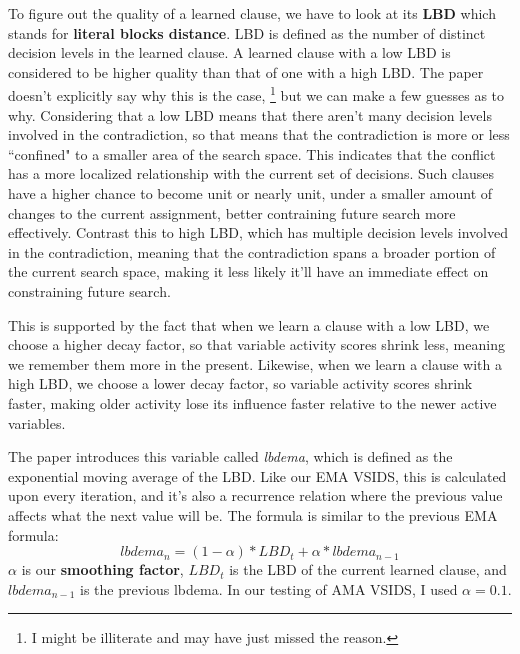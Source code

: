 To figure out the quality of a learned clause, we have to look at its \textbf{LBD}
which stands for \textbf{literal blocks distance}. LBD is defined as the number of 
distinct decision levels in the learned clause. A learned clause with a low LBD is considered to be higher 
quality than that of one with a high LBD. The paper doesn't explicitly say why this is the case,
\footnote{I might be illiterate and may have just missed the reason.}
but we can make a few guesses as to why. Considering that a low LBD means that there aren't 
many decision levels involved in the contradiction, so that means that the contradiction 
is more or less ``confined" to a smaller area of the search space. This indicates that 
the conflict has a more localized relationship with the current set of decisions. 
Such clauses have a higher chance to become unit or nearly unit, under a smaller 
amount of changes to the current assignment, better contraining future search more effectively.
Contrast this to high LBD, which has multiple decision levels involved in the contradiction, 
meaning that the contradiction spans a broader portion of the current search space, making 
it less likely it'll have an immediate effect on constraining future search.

This is supported by the fact that when we learn a clause with a low LBD, we choose a 
higher decay factor, so that variable activity scores shrink less, meaning we remember 
them more in the present. Likewise, when we learn a clause with a high LBD, we choose 
a lower decay factor, so variable activity scores shrink faster, making older activity 
lose its influence faster relative to the newer active variables.

The paper introduces this variable called \textit{lbdema}, which is defined as the 
exponential moving average of the LBD. Like our EMA VSIDS, this is calculated 
upon every iteration, and it's also a recurrence relation where the previous value affects 
what the next value will be. The formula is similar to the previous EMA formula:
$${lbdema}_n = (1 - \alpha) * {LBD}_t + \alpha * {lbdema}_{n - 1}$$
$\alpha$ is our \textbf{smoothing factor}, ${LBD}_t$ is the LBD of the current learned clause,
and \\${lbdema}_{n - 1}$ is the previous lbdema. In our testing of AMA VSIDS, I used 
$\alpha = 0.1$. 

